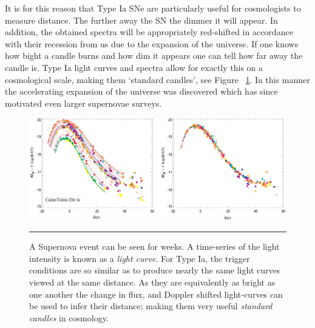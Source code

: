 It is for this reason that Type Ia SNe are particularly useful for cosmologists to measure distance.
The further away the SN the dimmer it will appear.
In addition, the obtained spectra will be appropriately red-shifted in accordance with their recession from us due to the expansion of the universe.
If one knows how bight a candle burns and how dim it appears one can tell how far away the candle is.
Type Ia light curves and spectra allow for exactly this on a cosmological scale, making them `standard candles', see Figure ~\ref{fig:light_curves}.
In this manner the accelerating expansion of the universe was discovered\citep{riess1998observational}\citep{perlmutter1999measurements} which has since motivated even larger supernovae surveys.
\begin{figure}[htbp]
	\centering
		\includegraphics[width = 1.0\textwidth]{./Figures/lise_paper_light_curves.jpg}
		\rule{35em}{0.5pt}
	\caption[SNe Ia Light Curves]{A Supernova event can be seen for weeks. A time-series of the light intensity is known as a \textit{light curve}. For Type Ia, the trigger conditions are so similar as to produce nearly the same light curves viewed at the same distance. As they are equivalently as bright as one another the change in flux, and Doppler shifted light-curves can be used to infer their distance; making them very useful \textit{standard candles}\citep{branch1992type} in cosmology. }
	\label{fig:light_curves}
\end{figure}

